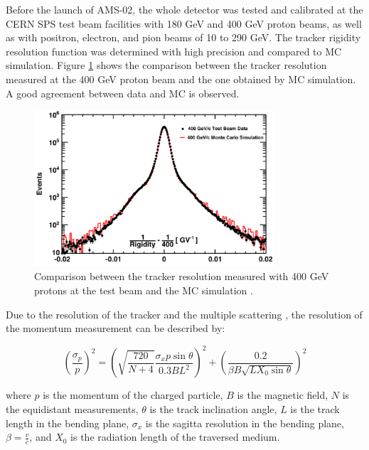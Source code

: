 Before the launch of AMS-02, the whole detector was tested and calibrated at the CERN SPS  test beam facilities with 180 GeV and 400 GeV proton beams, as well as with positron, electron, and pion beams of 10 to 290 GeV. The tracker rigidity resolution function was determined with high precision and compared to MC simulation. Figure \ref{Calibration} shows the comparison between the tracker resolution measured at the 400 GeV proton beam and the one obtained by MC simulation. A good agreement between data and MC is observed.  \par

\begin{figure}[H]
\centering
\includegraphics[width=0.8\textwidth, height=0.4\textheight ]{Figures/chapter3/Tracker/Calibration.png}
\caption[Tracker resolution measured with 400 GeV protons at the test beam and MC.]{Comparison between the tracker resolution measured with 400 GeV protons at the test beam and the MC simulation \cite{AMSWebside}.}  
\label{Calibration}
\end{figure}


Due to the resolution of the tracker and the multiple scattering \cite{TrackerResolutionPaper}, the resolution of the momentum measurement can be described by: 
 
\begin{equation}
\left(\frac{\sigma_{p}}{p} \right)^2 = \left( \sqrt{\frac{720}{N+4}} \frac{\sigma_{x} p  \sin \theta}{0.3 B L^2} \right)^2 + \left(\frac{0.2}{ \beta B \sqrt{LX_{0} \sin \theta} } \right)^2
\end{equation}

where $p$ is the momentum of the charged particle, $B$ is the magnetic field, $N$ is the equidistant measurements, $\theta$ is the track inclination angle, $L$ is the track length in the bending plane, $\sigma_x$ is the sagitta resolution in the bending plane, $\beta=\frac{v}{c}$, and $X_0$ is the radiation length of the traversed medium. \par 

